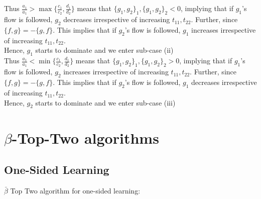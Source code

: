 \documentclass{article}
\newcommand{\UMA}{\mathcal{A}^{\texttt{UM}}}
\begin{document}
Thus $\frac{a_1}{a_1}>\max\{\frac{c_1}{c_2},\frac{d_1}{d_2}\}$ means that $  \{g_1,g_2\}_1, \{g_1,g_2\}_2<0$, implying that if $g_1$'s flow is followed, $g_2$ decreases irrespective of increasing $t_{11},t_{22}$. Further, since $\{f,g\}=-\{g,f\}$. This implies that if $g_2$'s flow is followed, $g_1$ increases irrespective of increasing $t_{11},t_{22}$.\\
Hence, $g_1$ starts to dominate and we enter sub-case (ii)\\

Thus $\frac{a_1}{a_1}<\min\{\frac{c_1}{c_2},\frac{d_1}{d_2}\}$ means that $  \{g_1,g_2\}_1, \{g_1,g_2\}_2>0$, implying that if $g_1$'s flow is followed, $g_2$ increases irrespective of increasing $t_{11},t_{22}$. Further, since $\{f,g\}=-\{g,f\}$. This implies that if $g_2$'s flow is followed, $g_1$ decreases irrespective of increasing $t_{11},t_{22}$.\\
Hence, $g_2$ starts to dominate and we enter sub-case (iii)
\section{$\beta$-Top-Two algorithms}
\label{app:beta-algos}
\subsection{One-Sided Learning}
$\bar{\beta}$ Top Two algorithm for one-sided learning: 

     
\end{document}
